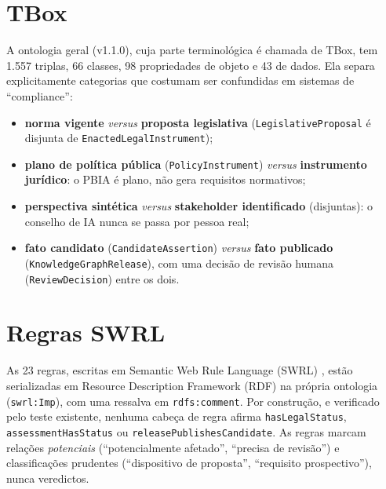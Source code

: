 \documentclass[12pt,a4paper,oneside,english,brazil]{abntex2}
\begin{document}
\section{TBox}
A ontologia geral (v1.1.0), cuja parte terminológica é chamada de TBox, tem 1.557 triplas, 66 classes, 98 propriedades de objeto e 43 de dados. Ela separa explicitamente categorias que costumam ser confundidas em sistemas de ``compliance'':

\begin{itemize}[leftmargin=*]
  \item \textbf{norma vigente} \emph{versus} \textbf{proposta legislativa} (\texttt{LegislativeProposal} é disjunta de \texttt{EnactedLegalInstrument});
  \item \textbf{plano de política pública} (\texttt{PolicyInstrument}) \emph{versus} \textbf{instrumento jurídico}: o PBIA é plano, não gera requisitos normativos;
  \item \textbf{perspectiva sintética} \emph{versus} \textbf{stakeholder identificado} (disjuntas): o conselho de IA nunca se passa por pessoa real;
  \item \textbf{fato candidato} (\texttt{CandidateAssertion}) \emph{versus} \textbf{fato publicado} (\texttt{KnowledgeGraphRelease}), com uma decisão de revisão humana (\texttt{ReviewDecision}) entre os dois.
\end{itemize}

\section{Regras SWRL}
As 23 regras, escritas em Semantic Web Rule Language (SWRL) \cite{w3c-swrl}, estão serializadas em Resource Description Framework (RDF) na própria ontologia (\texttt{swrl:Imp}), com uma ressalva em \texttt{rdfs:comment}. Por construção, e verificado pelo teste existente, nenhuma cabeça de regra afirma \texttt{hasLegalStatus}, \texttt{assessmentHasStatus} ou \texttt{releasePublishesCandidate}. As regras marcam relações \emph{potenciais} (``potencialmente afetado'', ``precisa de revisão'') e classificações prudentes (``dispositivo de proposta'', ``requisito prospectivo''), nunca veredictos.
\end{document}
